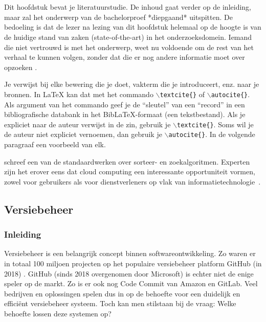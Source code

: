 \chapter{}
\label{ch:stand-van-zaken}
\graphicspath{{../../Images/}} 


Dit hoofdstuk bevat je literatuurstudie. De inhoud gaat verder op de inleiding, maar zal het onderwerp van de bachelorproef *diepgaand* uitspitten. De bedoeling is dat de lezer na lezing van dit hoofdstuk helemaal op de hoogte is van de huidige stand van zaken (state-of-the-art) in het onderzoeksdomein. Iemand die niet vertrouwd is met het onderwerp, weet nu voldoende om de rest van het verhaal te kunnen volgen, zonder dat die er nog andere informatie moet over opzoeken \autocite{Pollefliet2011}.

Je verwijst bij elke bewering die je doet, vakterm die je introduceert, enz. naar je bronnen. In \LaTeX{} kan dat met het commando \texttt{$\backslash${textcite\{\}}} of \texttt{$\backslash${autocite\{\}}}. Als argument van het commando geef je de ``sleutel'' van een ``record'' in een bibliografische databank in het Bib\LaTeX{}-formaat (een tekstbestand). Als je expliciet naar de auteur verwijst in de zin, gebruik je \texttt{$\backslash${}textcite\{\}}.
Soms wil je de auteur niet expliciet vernoemen, dan gebruik je \texttt{$\backslash${}autocite\{\}}. In de volgende paragraaf een voorbeeld van elk.

\textcite{Knuth1998} schreef een van de standaardwerken over sorteer- en zoekalgoritmen. Experten zijn het erover eens dat cloud computing een interessante opportuniteit vormen, zowel voor gebruikers als voor dienstverleners op vlak van informatietechnologie~\autocite{Creeger2009}.
\newpage
\section{Versiebeheer}
\subsection{Inleiding}
Versiebeheer is een belangrijk concept binnen softwareontwikkeling. Zo waren er in totaal 100 miljoen projecten op het populaire versiebeheer platform GitHub (in 2018) \autocite{Git2018}. GitHub (sinds 2018 overgenomen door Microsoft) is echter niet de enige speler op de markt. Zo is er ook nog Code Commit van Amazon en GitLab. Veel bedrijven en oplossingen spelen dus in op de behoefte voor een duidelijk en efficiënt versiebeheer systeem. Toch kan men stilstaan bij de vraag: Welke behoefte lossen deze systemen op?

